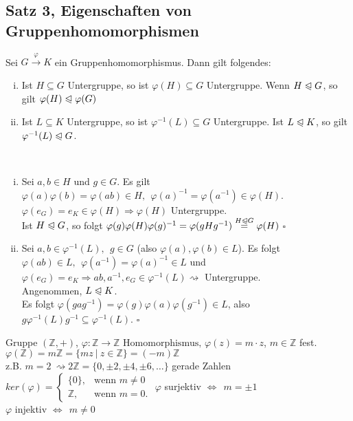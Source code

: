 
\subsection{Satz 3, Eigenschaften von Gruppenhomomorphismen}
\label{sub:satz_eigenschaften}
Sei $G\stackrel{\varphi}{\to}K $ ein Gruppenhomomorphismus. Dann gilt folgendes:
\begin{enumerate}[(i)]
	\item Ist $H\subseteq G$ Untergruppe, so ist $\varphi(H) \subseteq G$ Untergruppe. Wenn $H\trianglelefteqslant G$, so gilt $\varphi(H)\trianglelefteqslant\varphi(G)$
	\item Ist $L\subseteq K$ Untergruppe, so ist $\varphi^{-1}(L) \subseteq G$ Untergruppe. Ist $L\trianglelefteqslant K$, so gilt $\varphi^{-1}(L) \trianglelefteqslant G$.
\end{enumerate}

\\
\begin{enumerate}[(i)]
	\item Sei $a,b\in H$ und $g\in G$. Es gilt $\varphi(a)\varphi(b)=\varphi(ab)\in H,~~\varphi(a)^{-1}=\varphi(a^{-1})\in \varphi(H) $. $\varphi(e_G)=e_K \in \varphi(H) \Rightarrow \varphi(H)$ Untergruppe.\\
	Ist $H\trianglelefteqslant G$, so folgt $\varphi(g)\varphi(H)\varphi(g)^{-1}=\varphi(gHg^{-1})\stackrel{H\trianglelefteqslant G}{=}\varphi(H)$
	\hfill $\square$
	\item Sei $a,b \in \varphi^{-1}(L),~~g \in G$ (also $\varphi(a),\varphi(b) \in L$). Es folgt $\varphi(ab)\in L,~~\varphi(a^{-1})=\varphi(a)^{-1}\in L$ und $\varphi(e_G)=e_K \Rightarrow ab, a^{-1},e_G \in \varphi^{-1}(L) \rightsquigarrow$ Untergruppe.\\
	Angenommen, $L\trianglelefteqslant K$.\\ Es folgt $\varphi(gag^{-1})=\varphi(g)\varphi(a)\varphi(g^{-1}) \in L$, also $g\varphi^{-1}(L)g^{-1} \subseteq \varphi^{-1}(L)$.
	\hfill $\square$
\end{enumerate}

Gruppe $(\mathds{Z},+)$, $\varphi: \mathds{Z} \to \mathds{Z} \text{ Homomorphismus, }\varphi(z)=m\cdot z$, $m \in \mathds{Z}$ fest.\\
$\varphi(\mathds{Z})=m\mathds{Z}=\{mz~|~z\in \mathds{Z}\}=(-m)\mathds{Z}$\\
z.B. $m=2~\rightsquigarrow 2\mathds{Z}=\{0,\pm 2,\pm 4,\pm 6,\dots\}$ gerade Zahlen\\
$ker(\varphi)=\left\{\begin{array}{cl} \{0\}, & \text{wenn }m\not=0\\ \mathds{Z}, & \text{wenn } m=0. \end{array}\right.$
$\varphi$ surjektiv $\Leftrightarrow~~m=\pm 1$\\
$\varphi$ injektiv $\Leftrightarrow~~m\not=0$\\

